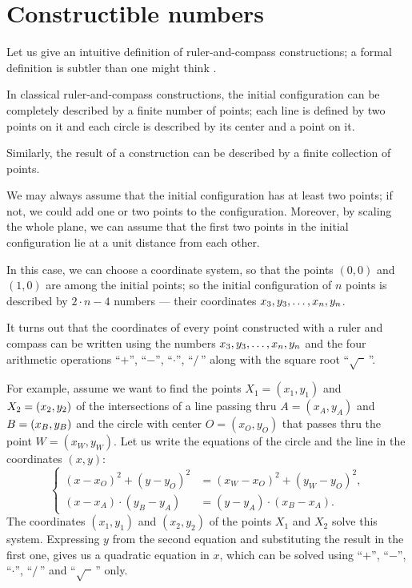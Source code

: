 %

\section{Constructible numbers}

Let us give an intuitive definition of ruler-and-compass constructions; a formal definition is subtler than one might think \cite{engeler}.

In classical ruler-and-compass constructions, the initial configuration can be completely described by a finite number of points;
each line is defined by two points on it and each circle is described by its center and a point on it.

Similarly, the result of a construction can be described by a finite collection of points.

We may always assume that the initial configuration has at least two points;
if not, we could add one or two points to the configuration.
Moreover, by scaling the whole plane, we can assume that the first two points in the initial configuration lie at a unit distance from each other.

In this case, we can choose a  coordinate system, 
so that the points $(0,0)$ and $(1,0)$ are among the initial points;
so the initial configuration of $n$ points is described by 
$2\cdot n-4$ numbers --- their coordinates $x_3,y_3,\dots,x_n,y_n$. 

\medskip

It turns out that the coordinates of every point constructed with a ruler and compass
can be written using the numbers $x_3,y_3,\dots,x_n,y_n$ and the four arithmetic operations ``$+$'', ``$-$'', ``$\cdot$'', ``$/\,$''
along with the square root ``$\sqrt{\phantom{a}}\,$''.

For example, assume we want to find the points $X_1=(x_1,y_1)$ and $X_2=(x_2,y_2)$ of the intersections of 
a line passing thru $A=(x_A,y_A)$ and $B=(x_B,y_B)$ and
the circle with center $O=(x_O,y_O)$ that passes thru the point $W=(x_W,y_W)$.
Let us write the equations of the circle and the line in the coordinates $(x,y)$:
$$
\left\{
\begin{aligned}
(x-x_O)^2+(y-y_O)^2&=(x_W-x_O)^2+(y_W-y_O)^2,
\\
(x-x_A)\cdot(y_B-y_A)&=(y-y_A)\cdot(x_B-x_A).
\end{aligned}
\right.
$$
The coordinates $(x_1,y_1)$ and $(x_2,y_2)$ of the points $X_1$ and $X_2$ solve this system.
Expressing $y$ from the second equation and substituting the result in the first one, gives us a quadratic equation in $x$, 
which can be solved using ``$+$'', ``$-$'', ``$\cdot$'', ``$/\,$''
and  ``$\sqrt{\phantom{a}}\,$'' only.


